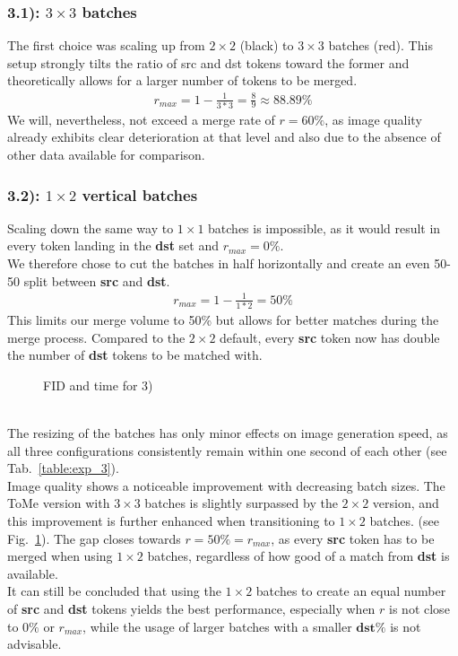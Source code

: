 \subsubsection*{3.1): $3 \times 3$ batches}
The first choice was scaling up from $2 \times 2$ (black) to $3 \times 3$ batches (red). This setup strongly tilts the ratio of src and dst tokens toward the former and theoretically allows for a larger number of tokens to be merged. 
\begin{align*}
    r_{max} = 1-\frac{1}{3*3} = \frac{8}{9} \approx 88.89\%
\end{align*}
We will, nevertheless, not exceed a merge rate of \(r=60\%\), as image quality already exhibits clear deterioration at that level and also due to the absence of other data available for comparison.



\subsubsection*{3.2): $1 \times 2$ vertical batches}
Scaling down the same way to $1 \times 1$ batches is impossible, as it would result in every token landing in the \textbf{dst} set and \(r_{max}=0\%\).\\
We therefore chose to cut the batches in half horizontally and create an even 50-50 split between \textbf{src} and \textbf{dst}.
\begin{align*}
    r_{max} = 1-\frac{1}{1*2} = 50\%
\end{align*}
This limits our merge volume to 50\% but allows for better matches during the merge process. Compared to the $2 \times 2$ default, every \textbf{src} token now has double the number of \textbf{dst} tokens to be matched with.\\
\begin{figure}[!htb]
    
    
\caption{FID and time for 3)}
\label{fig:exp_3}
\end{figure}\\
The resizing of the batches has only minor effects on image generation speed, as all three configurations consistently remain within one second of each other (see Tab.~\ref{table:exp_3}).\\
Image quality shows a noticeable improvement with decreasing batch sizes. The ToMe version with $3 \times 3$ batches is slightly surpassed by the $2 \times 2$ version, and this improvement is further enhanced when transitioning to $1 \times 2$ batches. (see Fig.~\ref{fig:exp_3}).
The gap closes towards \(r=50\%=r_{max}\), as every \textbf{src} token has to be merged when using $1 \times 2$ batches, regardless of how good of a match from \textbf{dst} is available.\\
It can still be concluded that using the $1 \times 2$ batches to create an equal number of \textbf{src} and \textbf{dst} tokens yields the best performance, especially when \(r\) is not close to \(0\%\) or \(r_{max}\), while the usage of larger batches with a smaller \(\textbf{dst\%}\) is not advisable.



